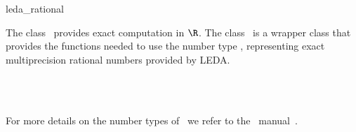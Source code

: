\ccDefGlobalScope{}
\begin{ccRefClass}{leda_rational}

\ccDefinition

The class \ccRefName\ provides exact computation in $\R$.
The class \ccRefName\ is a wrapper class that provides the functions 
needed to use the number type , representing exact 
multiprecision rational numbers provided by {\sc LEDA}. 


\ccIsModel
{}\\
\\

For more details on the number types of \leda\ we refer to the \leda\
manual~\cite{cgal:mnsu-lum}.

\end{ccRefClass}
